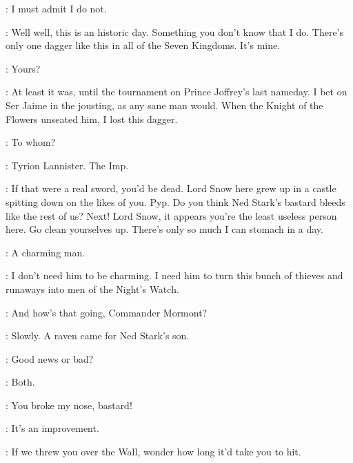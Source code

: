 \VARYS: I must admit I do not. 

\LITTLEFINGER: Well well, this is an historic day. Something you don't know that I do. There's only one dagger like this in all of the Seven Kingdoms. It's mine. 

\CATELYN: Yours? 

\LITTLEFINGER: At least it was, until the tournament on Prince Joffrey's last nameday. I bet on Ser Jaime in the jousting, as any sane man would. When the Knight of the Flowers unseated him, I lost this dagger. 

\CATELYN: To whom? 

\LITTLEFINGER: Tyrion Lannister. The Imp. 

\scene



\ALLISER: If that were a real sword, you'd be dead. Lord Snow here grew up in a castle spitting down on the likes of you. Pyp. Do you think Ned Stark's bastard bleeds like the rest of us?  Next!  Lord Snow, it appears you're the least useless person here. Go clean yourselves up. There's only so much I can stomach in a day. 


\TYRION: A charming man. 

\JEOR: I don't need him to be charming. I need him to turn this bunch of thieves and runaways into men of the Night's Watch. 

\TYRION: And how's that going, Commander Mormont? 

\JEOR: Slowly. A raven came for Ned Stark's son. 

\TYRION: Good news or bad? 

\JEOR: Both. 


\GRENN: You broke my nose, bastard! 

\JON: It's an improvement. 


\GRENN: If we threw you over the Wall, wonder how long it'd take you to hit. 

